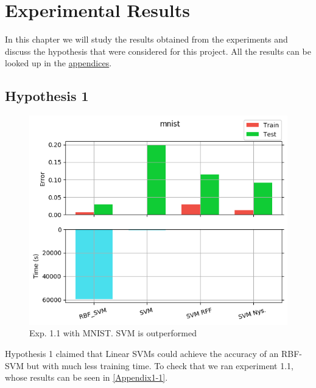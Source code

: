 
\chapter{Experimental Results} %

\label{Chapter4} %



\begin{pre-delivery}
  In this chapter we will study the results obtained from the experiments and
  discuss the hypothesis that were considered for this project. All the results
  can be looked up in the \hyperref[Appendix1-1]{appendices}.

\section*{Hypothesis 1}
\label{disc:h1}

\begin{figure}[th]
\centering
\includegraphics[scale=0.6]{Figures/1_1/mnist}
\decoRule
\caption{Exp. 1.1 with MNIST. SVM is outperformed}
\label{eje:1_1}
\end{figure}


Hypothesis 1 claimed that Linear SVMs could achieve the accuracy of an
RBF-SVM but with much less training time. To check that we ran experiment
1.1, whose results can be seen in \ref{Appendix1-1}.


\end{pre-delivery}
